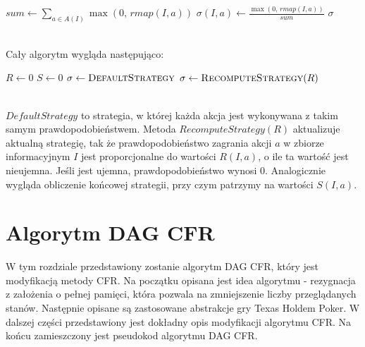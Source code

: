 \documentclass[licencjacka]{pracamgr}
\begin{document}
\begin{algorithmic}
            \State $sum \gets \sum\limits_{a \in A(I)} \max(0, \, rmap(I, a))$
                \State $\sigma(I, a) \gets \frac{\max(0, \, rmap(I, a))}{sum}$
            \EndFor
        \EndFor
        \State \Return $\sigma$
    \EndFunction
\end{algorithmic}

$\,$ \\
\noindent
Cały algorytm wygląda następująco: \\

\begin{algorithmic}
        \State $R \gets 0$
        \State $S \gets 0$
        \State $\sigma \gets \Call{DefaultStrategy}{}$
            \State {}
            \State $\sigma \gets \Call{RecomputeStrategy}{R}$
        \EndFor
        \State \Return {}
    \EndFunction
\end{algorithmic}

$\,$ \\
\noindent
$DefaultStrategy$ to strategia, w której każda akcja jest wykonywana z takim samym prawdopodobieństwem. Metoda
$RecomputeStrategy(R)$ aktualizuje aktualną strategię, tak że prawdopodobieństwo zagrania akcji $a$ w zbiorze informacyjnym
$I$ jest proporcjonalne do wartości $R(I, a)$, o ile ta wartość jest nieujemna. Jeśli jest ujemna, prawdopodobieństwo
wynosi $0$. Analogicznie wygląda obliczenie końcowej strategii, przy czym patrzymy na wartości $S(I, a)$.

\chapter{Algorytm DAG CFR}

\noindent
W tym rozdziale przedstawiony zostanie algorytm DAG CFR, który jest modyfikacją metody CFR. Na początku
opisana jest idea algorytmu - rezygnacja z założenia o pełnej pamięci, która pozwala na zmniejszenie liczby
przeglądanych stanów. Następnie opisane są zastosowane abstrakcje gry Texas Holdem Poker. W dalszej części
przedstawiony jest dokładny opis modyfikacji algorytmu CFR. Na końcu zamieszczony jest pseudokod algorytmu
DAG CFR. \\ 
\end{document}
